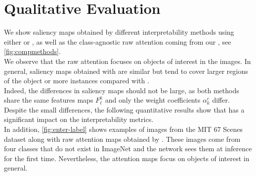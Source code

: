 \section{Qualitative Evaluation}
\label{sec:ca_qual}
We show saliency maps obtained by different interpretability methods using either \gap or \Ours, as 
well as the class-agnostic raw attention coming from our \Ours, see \autoref{fig:compmethods}.\\


\noindent We observe that the raw attention focuses on objects of interest in the images. 
In general, saliency maps obtained with \Ours are similar but tend to cover larger regions of the 
object or more instances compared with \gap.\\
  
Indeed, the differences in saliency maps should not be large, as both methods share the same 
features maps $F^k_\ell$ and only the weight coefficients $\alpha^c_k$ differ.
Despite the small differences, the following quantitative results show that \Ours has a significant 
impact on the interpretability metrics.\\
   
\noindent In addition, \autoref{fig:enter-label} shows examples of images from the MIT 67 Scenes 
dataset \autocite{quattoni2009recognizing} along with raw attention maps obtained by \Ours. These 
images come from four classes that do not exist in ImageNet and the network sees them at inference for 
the first time. Nevertheless, the attention maps focus on objects of interest in general.
